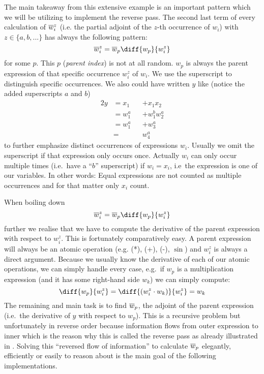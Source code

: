 The main takeaway from this extensive example is an important pattern which we will be utilizing to implement the reverse pass. The second last term of every calculation of $\overline{w}_{i}^z$ (i.e. the partial adjoint of the $z$-th occurrence of $w_i$) with $z \in \{a, b, ...\}$ has always the following pattern:
\newcommand{\defoverwiz}{\overw{i}^z = \overw{p}\diff{w_p}{w_i^z}}
\[ \defoverwiz \]
for some $p$. This $p$ (\emph{parent index}) is not at all random. $w_p$ is always the parent expression of that specific occurrence $w_i^z$ of $w_i$. We use the superscript to distinguish specific occurrences. We also could have written $y$ like (notice the added superscripts $a$ and $b$)
\begin{alignat*}{2}
    y & = x_1 &  & + x_1 x_2 \\
    & = w_1^a &  & + w_1^b w_2^a \\
    & = w_1^a    &  & + w_3^a       \\
    & =        &  & w_4^a
\end{alignat*}
to further emphasize distinct occurrences of expressions $w_i$. Usually we omit the superscript if that expression only occurs once. Actually $w_i$ can only occur multiple times (i.e.\ have a ``$b$'' superscript) if $w_i = x_i$, i.e\ the expression is one of our variables. In other words: Equal expressions are not counted as multiple occurrences and for that matter only $x_i$ count.

When boiling down
\[ \overw{i}^z = \overw{p}\diff{w_p}{w_i^z}\]
further we realise that we have to compute the derivative of the parent expression with respect to $w_i^z$. This is fortunately comparatively easy. A parent expression will always be an atomic operation (e.g. (*), (+), (-), $\sin$) and $w_i^z$ is always a direct argument. Because we usually know the derivative of each of our atomic operations, we can simply handle every case, e.g.\ if $w_p$ is a multiplication expression (and it has some right-hand side $w_k$) we can simply compute:
\[ \diff{w_p}{w_i^z} = \diff{(w_i^z \cdot w_k)}{w_i^z} = w_k \]
The remaining and main task is to find $\overline{w}_{p}$, the adjoint of the parent expression (i.e.\ the derivative of $y$ with respect to $w_p$). This is a recursive problem but unfortunately in reverse order because information flows from outer expression to inner which is the reason why this is called the reverse pass as already illustrated in . Solving this ``reversed flow of information'' to calculate $\overline{w}_{p}$ elegantly, efficiently or easily to reason about is the main goal of the following implementations.


